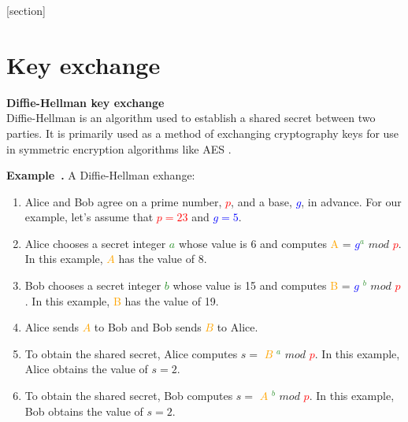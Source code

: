 [section]
\newenvironment{example}[1][]{\refstepcounter{example}\par\medskip
   \noindent \textbf{Example~\theexample. #1} \rmfamily}{\medskip}
 

\section{Key exchange}

\textbf{Diffie-Hellman key exchange} \\
Diffie-Hellman is an algorithm used to establish a shared secret between two parties. It is primarily used as a method of exchanging cryptography keys for use in symmetric encryption algorithms like AES \cite{keyexchange:diff-hellman}.

\begin{example}
A Diffie-Hellman exhange:
\end{example}



\begin{enumerate}
\item Alice and Bob agree on a prime number, \textcolor{red}{$p$}, and a base, \textcolor{blue}{$g$}, in advance. For our example, let's assume that \textcolor{red}{$p=23$} and \textcolor{blue}{$g=5$}.

\item Alice chooses a secret integer \textcolor{ForestGreen}{$a$} whose value is $6$ and computes \textcolor{orange}{A} = \textcolor{blue}{$g$}\textcolor{ForestGreen}{$^a$} $mod$ \textcolor{red}{$p$}. In this example, \textcolor{orange}{$A$} has the value of $8$.

\item Bob chooses a secret integer \textcolor{ForestGreen}{$b$} whose value is 15 and computes \textcolor{orange}{B} = \textcolor{blue}{$g$} \textcolor{ForestGreen}{$^b$} $mod$ \textcolor{red}{$p$}. In this example, \textcolor{orange}{B} has the value of 19.

\item Alice sends \textcolor{orange}{$A$} to Bob and Bob sends \textcolor{orange}{$B$} to Alice.

\item To obtain the shared secret, Alice computes \textcolor{NavyBlue}{$s =$} \textcolor{orange}{$B$} \textcolor{ForestGreen}{$^a$} $mod$ \textcolor{red}{$p$}. In this example, Alice obtains the value of \textcolor{NavyBlue}{$s=2$}.

\item To obtain the shared secret, Bob computes \textcolor{NavyBlue}{$s =$} \textcolor{orange}{$A$} \textcolor{ForestGreen}{$^b$} $mod$ \textcolor{red}{$p$}. In this example, Bob obtains the value of \textcolor{NavyBlue}{$s=2$}.
\end{enumerate}



